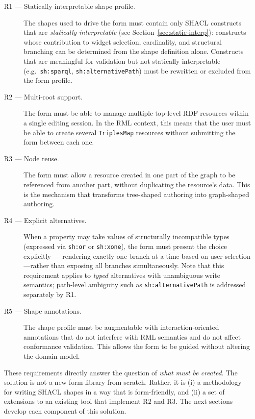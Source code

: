 \begin{description}
    \item[R1 — Statically interpretable shape profile.] The shapes used to drive the form must contain only SHACL constructs that are \emph{statically interpretable} (see Section~\ref{sec:static-interp}): constructs whose contribution to widget selection, cardinality, and structural branching can be determined from the shape definition alone. Constructs that are meaningful for validation but not statically interpretable (e.g.\ \texttt{sh:sparql}, \texttt{sh:alternativePath}) must be rewritten or excluded from the form profile.

    \item[R2 — Multi-root support.] The form must be able to manage multiple top-level RDF resources within a single editing session.
    In the RML context, this means that the user must be able to create several \texttt{TriplesMap} resources without submitting the form between each one.

    \item[R3 — Node reuse.] The form must allow a resource created in one part of the graph to be referenced from another part, without duplicating the resource's data. This is the mechanism that transforms tree-shaped authoring into graph-shaped authoring.

    \item[R4 — Explicit alternatives.] When a property may take values of structurally incompatible types (expressed via \texttt{sh:or} or
    \texttt{sh:xone}), the form must present the choice explicitly --- rendering exactly one branch at a time based on user selection ---rather than exposing all branches simultaneously.
    Note that this requirement applies to \emph{typed} alternatives with unambiguous write semantics; path-level ambiguity such as \texttt{sh:alternativePath} is addressed separately by R1.

    \item[R5 — Shape annotations.] The shape profile must be augmentable with interaction-oriented annotations that do not interfere with RML semantics and do not affect conformance validation. This allows the form to be guided without altering the domain model.
\end{description}

These requirements directly answer the question of \emph{what must be created}. The solution is not a new form library from scratch. Rather, it is (i) a methodology for writing SHACL shapes in a way that is form-friendly, and (ii) a set of extensions to an existing tool that implement R2 and R3. The next sections develop each component of this solution.

